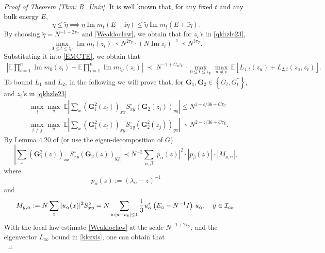 \documentclass[10pt,reqno]{article}
\DeclareMathOperator{\im}{{\mathrm{Im}}}
\theoremstyle{plain} %
\theoremstyle{remark}
\numberwithin{equation}{section}
\begin{document}
\begin{proof}[Proof of Theorem \ref{Thm: B_Univ}]
It is well known that, for any fixed $t$ and any bulk energy $E$,
$$
\eta\le \widetilde{\eta}\implies\eta \operatorname{Im} m_t\left(E +\mathrm{i} \eta \right) \leq \tilde{\eta} \operatorname{Im} m_t\left(E +\mathrm{i} \tilde{\eta}\right).
$$ 
By choosing $\widetilde{\eta}=N^{-1+2\tau_U}$ and \eqref{Weakloclaw}, we obtain that for $z_i$'s in \eqref{qkhzle23}, 
$$
\max_{0\le t\le t_U}\im m_t (z_i)\prec N^{2\tau_U}\cdot (N\im z_i)^{-1}\prec N^{3\tau_U}.$$
Substituting it into \eqref{EMCTE}, we obtain that
\begin{align}\label{EMCTE2}
 \left|\mathbb{E} \prod_{i=1}^n \operatorname{Im} m_0\left(z_i\right)-\mathbb{E} \prod_{i=1}^n \operatorname{Im} m_{t_U}\left(z_i\right)\right|
\;\prec\;  N^{-1+C_n\tau_U}\cdot  \max_{0\le t\le t_U}\max_{u\ne v}\,\mathbb{E}\left[  L_{1, t}\left(z_u\right)  +  L_{2, t}\left(z_u, z_v\right)\right].
\end{align}
To bound $L_1$ and $L_2$, in the following we will prove that, for $\mathbf{G}_1, \mathbf{G}_2 \in\left\{G_t, G_t^*\right\}$,  and $z_i$'s in \eqref{qkhzle23}
\begin{align}\label{jaklsdufowe}
  & \max_i\max_y\; \mathbb E\left| \sum_{ x}\left(\mathbf{G}_1^2(z_i)\right)_{x x} S_{x y}^{\circ}\left(\mathbf{G}_2(z_i)\right)_{yy}\right|\le N^{1-\mathfrak c/36+C\tau_U} \\\label{uywy7723r3rf}
 & \max_{i\ne j}\max_y\;\mathbb E\left|  \sum_{  x}\left(\mathbf{G}_1^2\left(z_i\right)\right)_{xy} S_{x y}^{\circ}\left(\mathbf{G}_2^2\left(z_j\right)\right)_{yx}\right| \prec N^{2-\mathfrak c/36+C\tau_U}.
\end{align}
By Lemma 4.20 of \cite{Xu:2024aa} (or use the eigen-decomposition
of $G$) 
\begin{equation}\label{yw982823}
     \left|\sum_{x}\left(\mathbf{G}_1^2(z)\right)_{xx} S_{x y}^{\circ}\left(\mathbf{G}_2(z)\right)_{yy}\right|\prec N^{-2}\sum_{\alpha,\beta} |p_\alpha(z)|^2 \cdot |p_\beta(z)|\cdot \left| M_{y,\alpha} \right| ,
\end{equation}
where $$p_\alpha(z):=\left(\lambda_\alpha-z\right)^{-1}$$
and 
$$
     M_{y,\alpha}:= N \sum_{x}|u_\alpha(x)|^2 S^{\circ}_{xy}= N \sum_{a: |a-a_0|\le 1}\frac13
       u^*_\alpha \left(E_a-N^{-1} I\right) \,u_\alpha , \quad y\in {\cal I}_{a_0}.
$$
With the  local law estimate \eqref{Weakloclaw} at the scale $N^{-1+2\tau_U}$, and the  eigenvector $L_\infty$ bound in  \eqref{kkzxis}, one can obtain that 
\begin{equation}\label{80whg}

\end{equation}
\end{proof}
\end{document}
